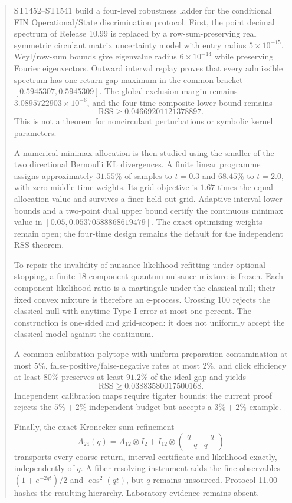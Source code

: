 \documentclass[11pt,a4paper]{article}
\begin{document}
\begin{abstract}
ST1452--ST1541 build a four-level robustness ladder for the conditional FIN
Operational/State discrimination protocol.  First, the point decimal spectrum
of Release 10.99 is replaced by a row-sum-preserving real symmetric circulant
matrix uncertainty model with entry radius $5\times10^{-15}$.  Weyl/row-sum
bounds give eigenvalue radius $6\times10^{-14}$ while preserving Fourier
eigenvectors.  Outward interval replay proves that every admissible spectrum
has one return-gap maximum in the common bracket
$[0.5945307,0.5945309]$.  The global-exclusion margin remains
$3.0895722903\times10^{-6}$, and the four-time composite lower bound remains
\[
\mathrm{RSS}\ge0.04669201121378897.
\]
This is not a theorem for noncirculant perturbations or symbolic kernel
parameters.

A numerical minimax allocation is then studied using the smaller of the two
directional Bernoulli KL divergences.  A finite linear programme assigns
approximately $31.55\%$ of samples to $t=0.3$ and $68.45\%$ to $t=2.0$, with
zero middle-time weights.  Its grid objective is $1.67$ times the equal-
allocation value and survives a finer held-out grid.  Adaptive interval lower
bounds and a two-point dual upper bound certify the continuous minimax value in
$[0.05,0.05370588868619479]$.  The exact optimizing weights remain open; the
four-time design remains the default for the independent RSS theorem.

To repair the invalidity of nuisance likelihood refitting under optional
stopping, a finite 18-component quantum nuisance mixture is frozen.  Each
component likelihood ratio is a martingale under the classical null; their
fixed convex mixture is therefore an e-process.  Crossing 100 rejects the
classical null with anytime Type-I error at most one percent.  The construction
is one-sided and grid-scoped: it does not uniformly accept the classical model
against the continuum.

A common calibration polytope with uniform preparation contamination at most
$5\%$, false-positive/false-negative rates at most $2\%$, and click efficiency
at least $80\%$ preserves at least $91.2\%$ of the ideal gap and yields
\[
\mathrm{RSS}\ge0.03883580017500168.
\]
Independent calibration maps require tighter bounds: the current proof rejects
the $5\%+2\%$ independent budget but accepts a $3\%+2\%$ example.

Finally, the exact Kronecker-sum refinement
\[
A_{24}(q)=A_{12}\otimes I_2+I_{12}\otimes
\begin{pmatrix}q&-q\\-q&q\end{pmatrix}
\]
transports every coarse return, interval certificate and likelihood exactly,
independently of $q$.  A fiber-resolving instrument adds the fine observables
$(1+e^{-2qt})/2$ and $\cos^2(qt)$, but $q$ remains unsourced.  Protocol 11.00
hashes the resulting hierarchy.  Laboratory evidence remains absent.
\end{abstract}
\end{document}
